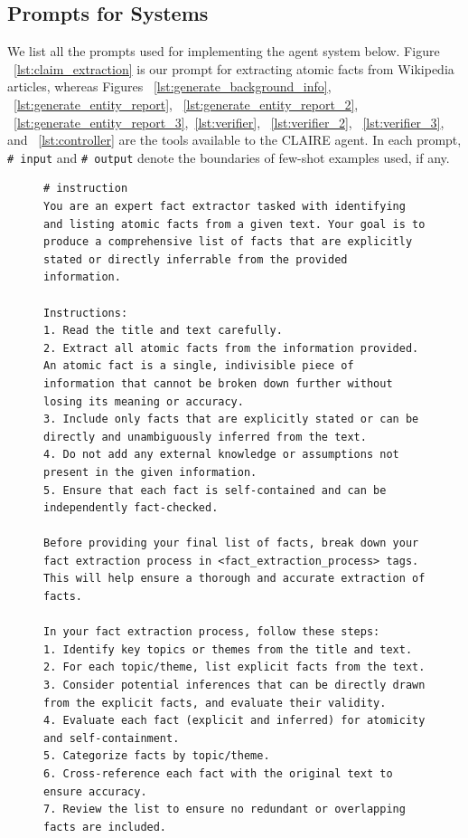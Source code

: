 \documentclass[11pt]{article}
\newcommand{\system}[0]{\textsc{CLAIRE}\xspace}
\begin{document}
\subsection{Prompts for Systems}

We list all the prompts used for implementing the agent system below. Figure ~\ref{lst:claim_extraction} is our prompt for extracting atomic facts from Wikipedia articles, whereas Figures ~\ref{lst:generate_background_info}, ~\ref{lst:generate_entity_report}, ~\ref{lst:generate_entity_report_2}, ~\ref{lst:generate_entity_report_3},~\ref{lst:verifier}, ~\ref{lst:verifier_2}, ~\ref{lst:verifier_3}, and ~\ref{lst:controller} are the tools available to the \system agent.
In each prompt, \texttt{\# input} and \texttt{\# output} denote the boundaries of few-shot examples used, if any.

\begin{figure}[htb]
\begin{lstlisting}
# instruction
You are an expert fact extractor tasked with identifying and listing atomic facts from a given text. Your goal is to produce a comprehensive list of facts that are explicitly stated or directly inferrable from the provided information.

Instructions:
1. Read the title and text carefully.
2. Extract all atomic facts from the information provided. An atomic fact is a single, indivisible piece of information that cannot be broken down further without losing its meaning or accuracy.
3. Include only facts that are explicitly stated or can be directly and unambiguously inferred from the text.
4. Do not add any external knowledge or assumptions not present in the given information.
5. Ensure that each fact is self-contained and can be independently fact-checked.

Before providing your final list of facts, break down your fact extraction process in <fact_extraction_process> tags. This will help ensure a thorough and accurate extraction of facts.

In your fact extraction process, follow these steps:
1. Identify key topics or themes from the title and text.
2. For each topic/theme, list explicit facts from the text.
3. Consider potential inferences that can be directly drawn from the explicit facts, and evaluate their validity.
4. Evaluate each fact (explicit and inferred) for atomicity and self-containment.
5. Categorize facts by topic/theme.
6. Cross-reference each fact with the original text to ensure accuracy.
7. Review the list to ensure no redundant or overlapping facts are included.


\end{lstlisting}
\end{figure}
\end{document}
